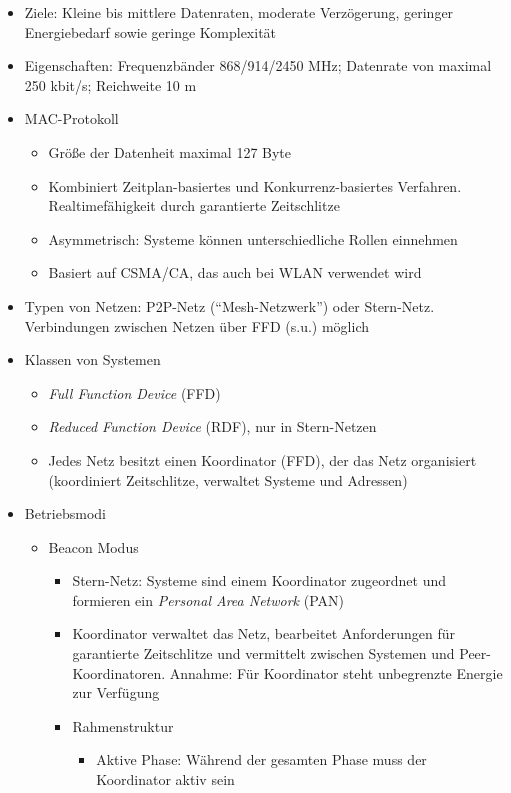 \begin{itemize}
\begin{itemize}
		\item Ziele: Kleine bis mittlere Datenraten, moderate Verzögerung, geringer Energiebedarf sowie geringe Komplexität
		\item Eigenschaften: Frequenzbänder 868/914/2450 MHz; Datenrate von maximal 250 kbit/s; Reichweite 10 m
		\item MAC-Protokoll
		\begin{itemize}
			\item Größe der Datenheit maximal 127 Byte
			\item Kombiniert Zeitplan-basiertes und Konkurrenz-basiertes Verfahren. Realtimefähigkeit durch garantierte Zeitschlitze
			\item Asymmetrisch: Systeme können unterschiedliche Rollen einnehmen
			\item Basiert auf CSMA/CA, das auch bei WLAN verwendet wird
		\end{itemize}
		\item Typen von Netzen: P2P-Netz ("`Mesh-Netzwerk"') oder Stern-Netz. Verbindungen zwischen Netzen über FFD (s.u.) möglich
		\item Klassen von Systemen
		\begin{itemize}
			\item \textit{Full Function Device} (FFD)
			\item \textit{Reduced Function Device} (RDF), nur in Stern-Netzen
			\item Jedes Netz besitzt einen Koordinator (FFD), der das Netz organisiert (koordiniert Zeitschlitze, verwaltet Systeme und Adressen)
		\end{itemize}
		\item Betriebsmodi
		\begin{itemize}
			\item Beacon Modus
			\begin{itemize}
				\item Stern-Netz: Systeme sind einem Koordinator zugeordnet und formieren ein \textit{Personal Area Network} (PAN)
				\item Koordinator verwaltet das Netz, bearbeitet Anforderungen für garantierte Zeitschlitze und vermittelt zwischen Systemen und Peer-Koordinatoren. Annahme: Für Koordinator steht unbegrenzte Energie zur Verfügung
				\item Rahmenstruktur
				\begin{itemize}
					\item {Aktive Phase:} Während der gesamten Phase muss der Koordinator aktiv sein
					\begin{enumerate}

\end{enumerate}
\end{itemize}
\end{itemize}
\end{itemize}
\end{itemize}
\end{itemize}

